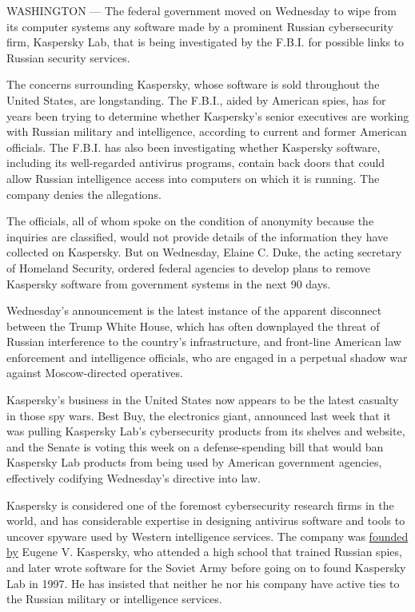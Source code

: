 WASHINGTON --- The federal government moved on Wednesday to wipe from
its computer systems any software made by a prominent Russian
cybersecurity firm, Kaspersky Lab, that is being investigated by the
F.B.I. for possible links to Russian security services.

The concerns surrounding Kaspersky, whose software is sold throughout
the United States, are longstanding. The F.B.I., aided by American
spies, has for years been trying to determine whether Kaspersky's senior
executives are working with Russian military and intelligence, according
to current and former American officials. The F.B.I. has also been
investigating whether Kaspersky software, including its well-regarded
antivirus programs, contain back doors that could allow Russian
intelligence access into computers on which it is running. The company
denies the allegations.

The officials, all of whom spoke on the condition of anonymity because
the inquiries are classified, would not provide details of the
information they have collected on Kaspersky. But on Wednesday, Elaine
C. Duke, the acting secretary of Homeland Security, ordered federal
agencies to develop plans to remove Kaspersky software from government
systems in the next 90 days.

Wednesday's announcement is the latest instance of the apparent
disconnect between the Trump White House, which has often downplayed the
threat of Russian interference to the country's infrastructure, and
front-line American law enforcement and intelligence officials, who are
engaged in a perpetual shadow war against Moscow-directed operatives.

Kaspersky's business in the United States now appears to be the latest
casualty in those spy wars. Best Buy, the electronics giant, announced
last week that it was pulling Kaspersky Lab's cybersecurity products
from its shelves and website, and the Senate is voting this week on a
defense-spending bill that would ban Kaspersky Lab products from being
used by American government agencies, effectively codifying Wednesday's
directive into law.

Kaspersky is considered one of the foremost cybersecurity research firms
in the world, and has considerable expertise in designing antivirus
software and tools to uncover spyware used by Western intelligence
services. The company was
\href{https://www.nytimes.com/2016/06/11/world/europe/kaspersky-lab-russia-cybercrime-internet.html?mcubz=3}{founded
by} Eugene V. Kaspersky, who attended a high school that trained Russian
spies, and later wrote software for the Soviet Army before going on to
found Kaspersky Lab in 1997. He has insisted that neither he nor his
company have active ties to the Russian military or intelligence
services.

